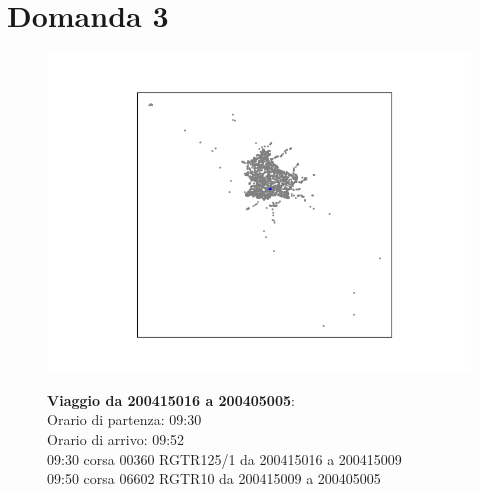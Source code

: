 \documentclass{article}
\begin{document}
\section*{Domanda 3}
\begin{figure}[H]
	\begin{minipage}{0.55\linewidth}
		\centering
		\hspace*{-3cm}\includegraphics[width=1.0\linewidth, valign=t]{figures/200415016_200405005}
	\end{minipage}
	\hspace*{-2cm}\begin{minipage}{0.7\linewidth}
		\textbf{Viaggio da 200415016 a 200405005}:\\
		Orario di partenza: 09:30\\
		Orario di arrivo: 09:52\\
		09:30 corsa 00360 RGTR125/1 da 200415016 a 200415009\\
		09:50 corsa 06602 RGTR10 da 200415009 a 200405005
			\end{minipage}
\end{figure}
\end{document}
